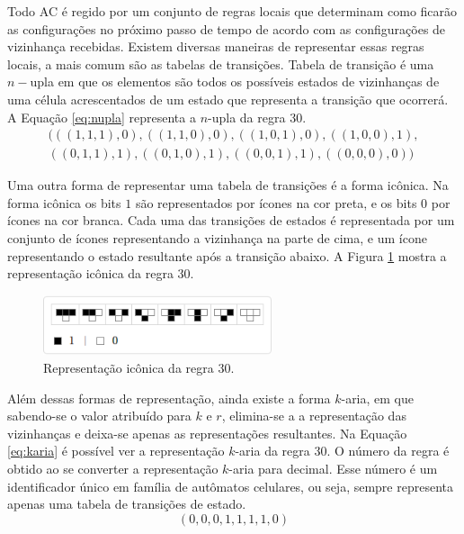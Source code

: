 \documentclass[12pt,a4paper]{article}
\begin{document}
Todo AC é regido por um conjunto de regras locais que determinam como ficarão as configurações no próximo passo de tempo de acordo com as configurações de vizinhança recebidas. Existem diversas maneiras de representar essas regras locais, a mais comum são as tabelas de transições. Tabela de transição é uma $n-$upla em que os elementos são todos os possíveis estados de vizinhanças de uma célula acrescentados de um estado que representa a transição que ocorrerá. A Equação \ref{eq:nupla} representa a $n$-upla da regra 30.
\begin{equation}
\begin{split}
(((1,1,1),0),((1,1,0),0),((1,0,1),0),((1,0,0),1),\\
((0,1,1),1),((0,1,0),1),((0,0,1),1),((0,0,0),0))
\label{eq:nupla}
\end{split}
\end{equation}

Uma outra forma de representar uma tabela de transições é a forma icônica. Na forma icônica os bits $1$ são representados por ícones na cor preta, e os bits $0$ por ícones na cor branca. Cada uma das transições de estados é representada por um conjunto de ícones representando a vizinhança na parte de cima, e um ícone representando o estado resultante após a transição abaixo. A Figura \ref{fig:repIconicaR30} mostra a representação icônica da regra 30.

	\begin{figure}[h!]
	  \centering
	  \includegraphics[width=0.6\textwidth]{fig_repIconicaR30.png}
	  \caption{Representação icônica da regra 30.}
	  \label{fig:repIconicaR30}
	\end{figure}

Além dessas formas de representação, ainda existe a forma $k$-aria, em que sabendo-se o valor atribuído para $k$ e $r$, elimina-se a a representação das vizinhanças e deixa-se apenas as representações resultantes. Na Equação \ref{eq:karia} é possível ver a representação $k$-aria da regra 30. O número da regra é obtido ao se converter a representação $k$-aria para decimal. Esse número é um identificador único em família de autômatos celulares, ou seja, sempre representa apenas uma tabela de transições de estado.
\begin{equation}
(0,0,0,1,1,1,1,0)
\label{eq:karia}
\end{equation}
\end{document}
